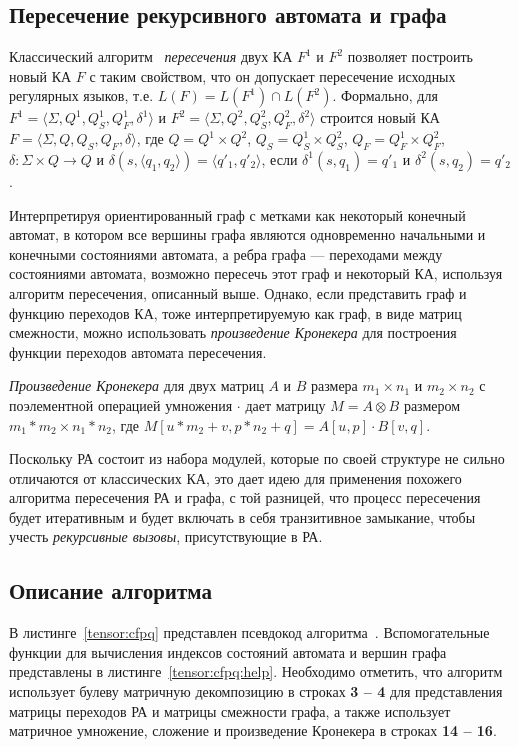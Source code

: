 \documentclass[14pt]{matmex-diploma-custom}
\begin{document}
\subsection{Пересечение рекурсивного автомата и графа}

Классический алгоритм~\cite{book:automata_theory} \textit{пересечения} двух КА $F^1$ и $F^2$ позволяет построить новый КА $F$ с таким свойством, что он допускает пересечение исходных регулярных языков, т.е. $L(F) = L(F^1) \cap L(F^2)$. Формально, для $F^1 = \langle \Sigma, Q^1, Q^1_S, Q^1_F, \delta^1 \rangle$ и $F^2 = \langle \Sigma, Q^2, Q^2_S, Q^2_F, \delta^2 \rangle$ строится новый КА $F = \langle \Sigma, Q, Q_S, Q_F, \delta \rangle$, где $Q = Q^1 \times Q^2$, $Q_S = Q^1_S \times Q^2_S$, $Q_F = Q^1_F \times Q^2_F$, $\delta: \Sigma \times Q \rightarrow Q$ и $\delta(s, \langle q_1, q_2 \rangle) = \langle q'_1, q'_2 \rangle$, если $\delta^1 (s, q_1)=q'_1$ и $\delta^2 (s, q_2)=q'_2$. 

Интерпретируя ориентированный граф с метками как некоторый конечный автомат, в котором все вершины графа являются одновременно начальными и конечными состояниями автомата, а ребра графа --- переходами между состояниями автомата, возможно пересечь этот граф и некоторый КА, используя алгоритм пересечения, описанный выше. Однако, если представить граф и функцию переходов КА, тоже интерпретируемую как граф, в виде матриц смежности, можно использовать \textit{произведение Кронекера} для построения функции переходов автомата пересечения.

\textit{Произведение Кронекера} для двух матриц $A$ и $B$ размера $m_1 \times n_1$ и $m_2 \times n_2$ с поэлементной операцией умножения $\cdot$ дает матрицу $M = A \otimes B$ размером $m_1 * m_2 \times n_1 * n_2$, где $M[u * m_2 + v, p * n_2 + q] = A[u, p] \cdot B[v, q]$. 

Поскольку РА состоит из набора модулей, которые по своей структуре не сильно отличаются от классических КА, это дает идею для применения похожего алгоритма пересечения РА и графа, с той  разницей, что процесс пересечения будет итеративным и будет включать в себя транзитивное замыкание, чтобы учесть \textit{рекурсивные вызовы}, присутствующие в РА. 

\subsection{Описание алгоритма}

В листинге~\ref{tensor:cfpq} представлен псевдокод алгоритма~\cite{inbook:kronecker_cfpq_adbis}. Вспомогательные функции для вычисления индексов состояний автомата и вершин графа представлены в листинге~\ref{tensor:cfpq:help}. Необходимо отметить, что алгоритм использует булеву матричную декомпозицию в строках \textbf{3 -- 4} для представления матрицы переходов РА и матрицы смежности графа, а также использует матричное умножение, сложение и произведение Кронекера в строках \textbf{14 -- 16}.
\end{document}
